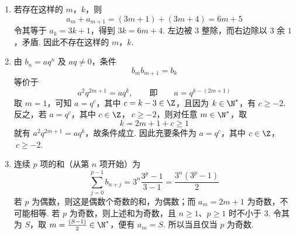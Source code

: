 \begin{solution}
\begin{enumerate}
\item 若存在这样的 \(m\)，\(k\)，则
  \[
  a_m+a_{m+1}=(3m+1)+(3m+4)=6m+5
  \]
  令其等于 \(a_k=3k+1\)，得到 \(3k=6m+4\). 左边被 \(3\) 整除，而右边除以 \(3\) 余 \(1\)，矛盾. 因此不存在这样的 \(m\)，\(k\).
\item 由 \(b_n=aq^n\) 及 \(aq\ne0\)，条件
  \[
  b_mb_{m+1}=b_k
  \]
  等价于
  \[
  a^2q^{2m+1}=aq^k,\qquad\text{即}\qquad a=q^{k-(2m+1)}
  \]
  取 \(m=1\)，可知 \(a=q^c\)，其中 \(c=k-3\in\Z\)，且因为 \(k\in\N^*\)，有 \(c\geqslant-2\). 反之，若 \(a=q^c\)，其中 \(c\in\Z\)，\(\ c\geqslant-2\)，则对任意 \(m\in\N^*\)，取
  \[
  k=2m+1+c\geqslant1
  \]
  就有 \(a^2q^{2m+1}=aq^k\)，故条件成立. 因此充要条件为 \(a=q^c\)，其中 \(c\in\Z\)，\(\ c\geqslant-2\).
\item 连续 \(p\) 项的和（从第 \(n\) 项开始）为
  \[
  \sum_{j=0}^{p-1}b_{n+j}=3^n\frac{3^p-1}{3-1}
  =\frac{3^n(3^p-1)}2
  \]
  若 \(p\) 为偶数，则这是偶数个奇数的和，为偶数；而 \(a_m=2m+1\) 为奇数，不可能相等. 若 \(p\) 为奇数，则上述和为奇数，且 \(n\geqslant1\)、\(p\geqslant1\) 时不小于 \(3\). 令其为 \(S\)，取 \(m=\frac{(S-1)}{2}\in\N^*\)，便有 \(a_m=S\). 所以当且仅当 \(p\) 为奇数.
\end{enumerate}
\end{solution}
